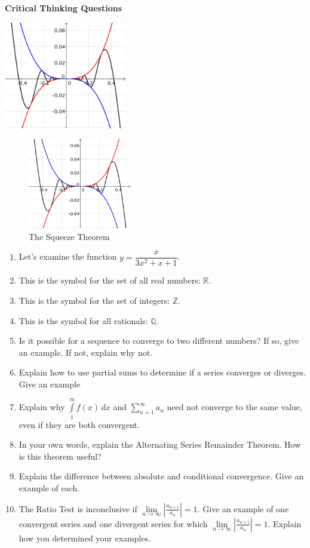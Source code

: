 \documentclass[12pt, letterpaper]{article}
\def\eq1{y=\dfrac{x}{3x^2+x+1}}
\newcommand{\set}[1]{\setlength\itemsep{#1em}}
\begin{document}
 
\textbf{Critical Thinking Questions}

\begin{center}
\includegraphics[width=0.4\textwidth]{limit}
\end{center}

\begin{figure}[H]
\centering
\includegraphics[width=0.4\textwidth]{limit}
\caption{The Squeeze Theorem}
\end{figure}

\begin{enumerate}
\set{1.2}
\item Let's examine the function $\eq1$.
\item This is the symbol for the set of all real numbers: $\mathbb{R}$.
\item This is the symbol for the set of integers: $\mathbb{Z}$.
\item This is the symbol for all rationals: $\mathbb{Q}$.
\item Is it possible for a sequence to converge to two different numbers? If so, give an example. If not, explain why not.
\item Explain how to use partial sums to determine if a series converges or diverges. Give an example
\item Explain why $\int\limits_{1}^{\infty} f(x)\,dx$ and $\sum\limits_{n=1}^{\infty} a_n$ need not converge to the same value, even if they are both convergent.
\item  In your own words, explain the Alternating Series Remainder Theorem. How is this theorem useful?
\item Explain the difference between absolute and conditional convergence. Give an example of each.
\item The Ratio Test is inconclusive if $\displaystyle{\lim\limits_{n \to \infty} \left| \frac{a_{n+1}}{a_n} \right| =1}$. Give an example of one convergent series and one divergent series for which $\displaystyle{\lim\limits_{n \to \infty} \left| \frac{a_{n+1}}{a_n} \right| =1}$. Explain how you determined your examples.
\end{enumerate}
\end{document}
